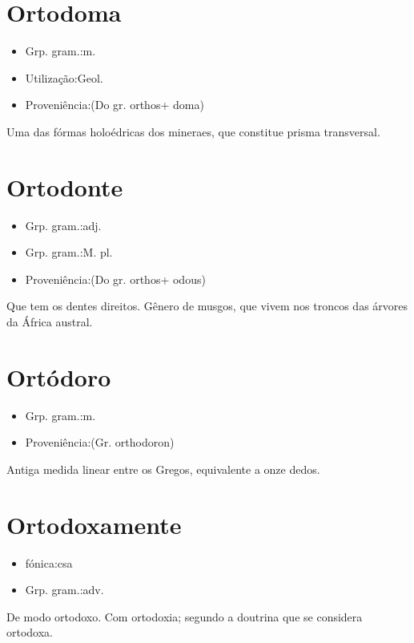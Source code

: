 \section{Ortodoma}
\begin{itemize}
\item {Grp. gram.:m.}
\end{itemize}
\begin{itemize}
\item {Utilização:Geol.}
\end{itemize}
\begin{itemize}
\item {Proveniência:(Do gr. \textunderscore orthos\textunderscore  + \textunderscore doma\textunderscore )}
\end{itemize}
Uma das fórmas holoédricas dos mineraes, que constitue prisma transversal.
\section{Ortodonte}
\begin{itemize}
\item {Grp. gram.:adj.}
\end{itemize}
\begin{itemize}
\item {Grp. gram.:M. pl.}
\end{itemize}
\begin{itemize}
\item {Proveniência:(Do gr. \textunderscore orthos\textunderscore  + \textunderscore odous\textunderscore )}
\end{itemize}
Que tem os dentes direitos.
Gênero de musgos, que vivem nos troncos das árvores da África austral.
\section{Ortódoro}
\begin{itemize}
\item {Grp. gram.:m.}
\end{itemize}
\begin{itemize}
\item {Proveniência:(Gr. \textunderscore orthodoron\textunderscore )}
\end{itemize}
Antiga medida linear entre os Gregos, equivalente a onze dedos.
\section{Ortodoxamente}
\begin{itemize}
\item {fónica:csa}
\end{itemize}
\begin{itemize}
\item {Grp. gram.:adv.}
\end{itemize}
De modo ortodoxo.
Com ortodoxia; segundo a doutrina que se considera ortodoxa.

